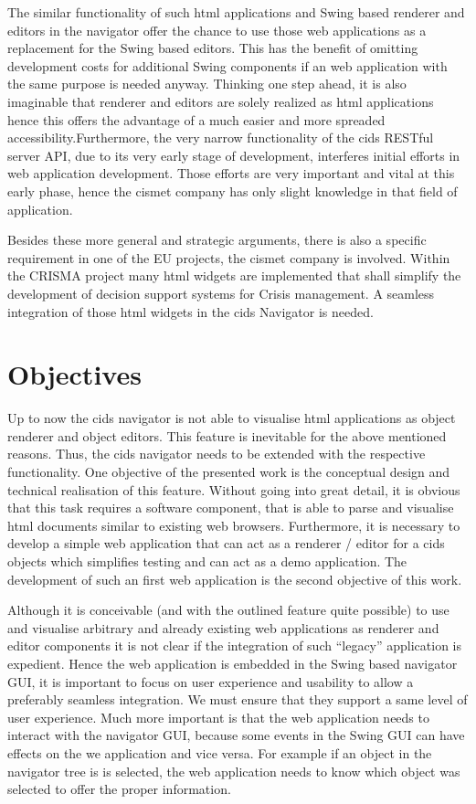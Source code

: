 The similar functionality of such html applications and Swing based renderer and editors in the navigator offer the chance to use those web applications as a replacement for the Swing based editors.
This has the benefit of omitting development costs for additional Swing components if an web application with the same purpose is needed anyway.
Thinking one step ahead, it is also imaginable that renderer and editors are solely realized as html applications hence this offers the advantage of a much easier and more spreaded accessibility.Furthermore, the very narrow functionality of the cids RESTful server API, due to its very early stage of development, interferes initial efforts in web application development.
Those efforts are very important and vital at this early phase, hence the cismet company has only slight knowledge in that field of application.

 
Besides these more general and strategic arguments, there is also a specific requirement in one of the EU projects, the cismet company is involved.
Within the CRISMA project many html widgets are implemented that shall simplify the development of decision support systems for Crisis management.
A seamless integration of those html widgets in the cids Navigator is needed.


\section{Objectives}\label{chap:intro-objectives}

Up to now the cids navigator is not able to visualise html applications as object renderer and object editors.
This feature is inevitable for the above mentioned reasons.
Thus, the cids navigator needs to be extended with the respective functionality.
One objective of the presented work is the conceptual design and technical realisation of this feature.
Without going into great detail, it is obvious that this task requires a software component, that is able to parse and visualise html documents similar to existing web browsers.
Furthermore, it is necessary to develop a simple web application that can act as a renderer / editor for a cids objects which simplifies testing and can act as a demo application.
The development of such an first web application is the second objective of this work.

Although it is conceivable (and with the outlined feature quite possible) to use and visualise arbitrary and already existing web applications as renderer and editor components it is not clear if the integration of such \enquote{legacy} application is expedient.
Hence the web application is embedded in the Swing based navigator GUI, it is important to focus on user experience and usability to allow a preferably seamless integration.
We must ensure that they support a same level of user experience.
Much more important is that the web application needs to interact with the navigator GUI, because some events in the Swing GUI can have effects on the we application and vice versa.
For example if an object in the navigator tree is is selected, the web application needs to know which object was selected to offer the proper information.


